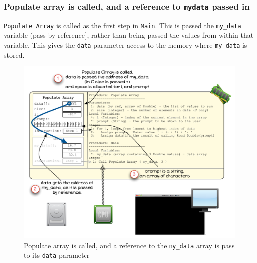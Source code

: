 
\clearpage
\subsubsection{Populate array is called, and a reference to \texttt{my{\textunderscore}data} passed in} %
\label{ssub:populate_array_is_called_and_a_reference_to_my_data_passed_in}

\texttt{Populate Array} is called as the first step in \texttt{Main}. This is passed the \texttt{my\_data} variable (pass by reference), rather than being passed the values from within that variable. This gives the \texttt{data} parameter access to the memory where \texttt{my\_data} is stored.

\begin{figure}[htbp]
   \centering
   \includegraphics[width=\textwidth]{./topics/arrays/images/PopulateArray2} 
   \caption{Populate array is called, and a reference to the \texttt{my\_data} array is pass to its \texttt{data} parameter}
   \label{fig:populate-array-vis-2}
\end{figure}

